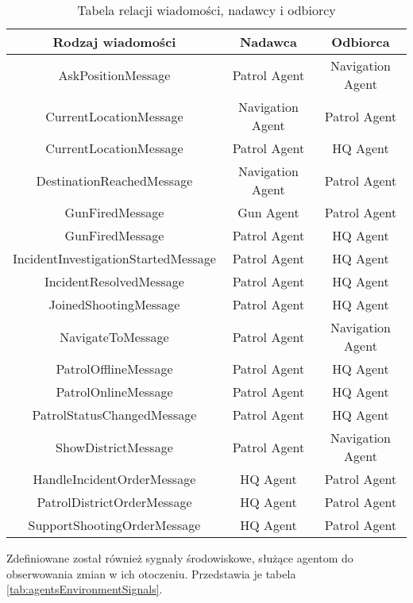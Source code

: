 \begin{table}
    \centering
    \begin{tabular}{|c|c|c|} 
     \hline
     Rodzaj wiadomości & Nadawca & Odbiorca \\
     \hline
     \hline
     AskPositionMessage & Patrol Agent & Navigation Agent \\ 
     \hline
     CurrentLocationMessage & Navigation Agent & Patrol Agent \\ 
     \hline
     CurrentLocationMessage & Patrol Agent & HQ Agent \\ 
     \hline
     DestinationReachedMessage & Navigation Agent & Patrol Agent \\ 
     \hline
     GunFiredMessage & Gun Agent & Patrol Agent \\ 
     \hline
     GunFiredMessage & Patrol Agent & HQ Agent \\ 
     \hline
     IncidentInvestigationStartedMessage & Patrol Agent & HQ Agent \\ 
     \hline
     IncidentResolvedMessage & Patrol Agent & HQ Agent \\ 
     \hline
     JoinedShootingMessage & Patrol Agent & HQ Agent \\ 
     \hline
     NavigateToMessage & Patrol Agent & Navigation Agent \\ 
     \hline
     PatrolOfflineMessage & Patrol Agent & HQ Agent \\ 
     \hline
     PatrolOnlineMessage & Patrol Agent & HQ Agent \\ 
     \hline
     PatrolStatusChangedMessage & Patrol Agent & HQ Agent \\ 
     \hline
     ShowDistrictMessage & Patrol Agent & Navigation Agent \\ 
     \hline
     HandleIncidentOrderMessage & HQ Agent & Patrol Agent \\ 
     \hline
     PatrolDistrictOrderMessage & HQ Agent & Patrol Agent \\ 
     \hline
     SupportShootingOrderMessage & HQ Agent & Patrol Agent \\ 
     \hline
    \end{tabular}
    \caption{Tabela relacji wiadomości, nadawcy i odbiorcy}
    \label{tab:agentsMessagesSenderReceiver}
\end{table}

\par Zdefiniowane został również sygnały środowiskowe, służące agentom do obserwowania zmian w ich otoczeniu. Przedstawia je tabela \ref{tab:agentsEnvironmentSignals}.

